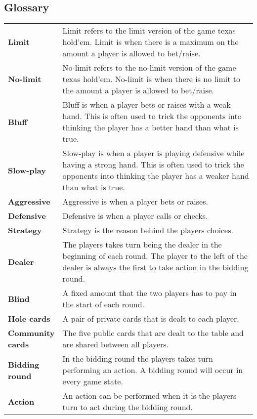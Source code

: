 \subsection*{Glossary}
\begin{tabular}{ p{0.18\linewidth} p{0.82\linewidth} }
\textbf{Limit} & Limit refers to the limit version of the game texas hold'em. Limit is when there is a maximum on the amount a player is allowed to bet/raise.\\
\textbf{No-limit} & No-limit refers to the no-limit version of the game texas hold'em. No-limit is when there is no limit to the amount a player is allowed to bet/raise.\\
\textbf{Bluff} & Bluff is when a player bets or raises with a weak hand. This is often used to trick the opponents into thinking the player has a better hand than what is true.\\  
\textbf{Slow-play} & Slow-play is when a player is playing defensive while having a strong hand. This is often used to trick the opponents into thinking the player has a weaker hand than what is true.\\
\textbf{Aggressive} & Aggressive is when a player bets or raises.\\
\textbf{Defensive} & Defensive is when a player calls or checks.\\
\textbf{Strategy} & Strategy is the reason behind the players choices.\\
\textbf{Dealer} & The players takes turn being the dealer in the beginning of each round. The player to the left of the dealer is always the first to take action in the bidding round.\\
\textbf{Blind} & A fixed amount that the two players has to pay in the start of each round.\\
\textbf{Hole cards} & A pair of private cards that is dealt to each player. \\
\textbf{Community cards} & The five public cards that are dealt to the table and are shared between all players.\\
\textbf{Bidding round} & In the bidding round the players takes turn performing an action. A bidding round will occur in every game state.\\
\textbf{Action} & An action can be performed when it is the players turn to act during the bidding round.
\end{tabular}

